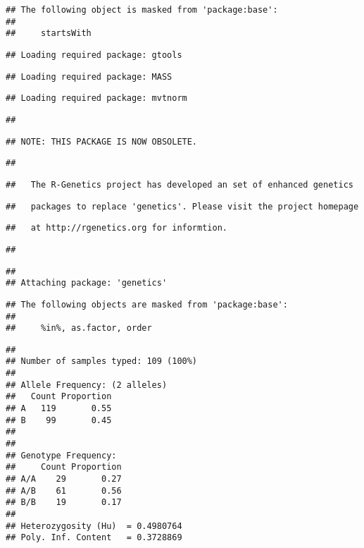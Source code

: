 \documentclass[
]{article}
\begin{document}
\begin{verbatim}
## The following object is masked from 'package:base':
## 
##     startsWith
\end{verbatim}

\begin{verbatim}
## Loading required package: gtools
\end{verbatim}

\begin{verbatim}
## Loading required package: MASS
\end{verbatim}

\begin{verbatim}
## Loading required package: mvtnorm
\end{verbatim}

\begin{verbatim}
## 
\end{verbatim}

\begin{verbatim}
## NOTE: THIS PACKAGE IS NOW OBSOLETE.
\end{verbatim}

\begin{verbatim}
## 
\end{verbatim}

\begin{verbatim}
##   The R-Genetics project has developed an set of enhanced genetics
\end{verbatim}

\begin{verbatim}
##   packages to replace 'genetics'. Please visit the project homepage
\end{verbatim}

\begin{verbatim}
##   at http://rgenetics.org for informtion.
\end{verbatim}

\begin{verbatim}
## 
\end{verbatim}

\begin{verbatim}
## 
## Attaching package: 'genetics'
\end{verbatim}

\begin{verbatim}
## The following objects are masked from 'package:base':
## 
##     %in%, as.factor, order
\end{verbatim}

\begin{verbatim}
## 
## Number of samples typed: 109 (100%)
## 
## Allele Frequency: (2 alleles)
##   Count Proportion
## A   119       0.55
## B    99       0.45
## 
## 
## Genotype Frequency:
##     Count Proportion
## A/A    29       0.27
## A/B    61       0.56
## B/B    19       0.17
## 
## Heterozygosity (Hu)  = 0.4980764
## Poly. Inf. Content   = 0.3728869
\end{verbatim}
\end{document}
